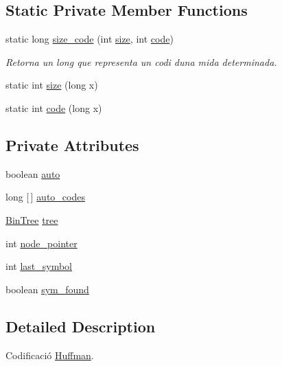 \subsection*{Static Private Member Functions}
\begin{DoxyCompactItemize}
\item 
static long \hyperlink{classdomini_1_1algorithm_1_1Huffman_a2c035fb63cf7b945bc56cca90c1343a3}{size\+\_\+code} (int \hyperlink{classdomini_1_1algorithm_1_1Huffman_a9ebf8a890196bc1f3af6917707c1096f}{size}, int \hyperlink{classdomini_1_1algorithm_1_1Huffman_a6ff0cdc5b992431ccfe8d77971ebf5e8}{code})
\begin{DoxyCompactList}\small\item\em Retorna un long que representa un codi d\textquotesingle{}una mida determinada. \end{DoxyCompactList}\item 
static int \hyperlink{classdomini_1_1algorithm_1_1Huffman_a9ebf8a890196bc1f3af6917707c1096f}{size} (long x)
\item 
static int \hyperlink{classdomini_1_1algorithm_1_1Huffman_a6ff0cdc5b992431ccfe8d77971ebf5e8}{code} (long x)
\end{DoxyCompactItemize}
\subsection*{Private Attributes}
\begin{DoxyCompactItemize}
\item 
boolean \hyperlink{classdomini_1_1algorithm_1_1Huffman_a1c2b6800e0b472c65f44ff9cf28a5b35}{auto}
\item 
long \mbox{[}$\,$\mbox{]} \hyperlink{classdomini_1_1algorithm_1_1Huffman_a0fa542dd4e914d8c0da5c070fe9f682f}{auto\+\_\+codes}
\item 
\hyperlink{classdomini_1_1utils_1_1BinTree}{Bin\+Tree} \hyperlink{classdomini_1_1algorithm_1_1Huffman_a6c010fa777f5601b7be908f8c876cf8e}{tree}
\item 
int \hyperlink{classdomini_1_1algorithm_1_1Huffman_a71e35eb22265910f918572b34eaa6b2f}{node\+\_\+pointer}
\item 
int \hyperlink{classdomini_1_1algorithm_1_1Huffman_a0da0a4274a58653bbe3e1c753adfbe38}{last\+\_\+symbol}
\item 
boolean \hyperlink{classdomini_1_1algorithm_1_1Huffman_a3453c53e74badc739d51208d35ba372d}{sym\+\_\+found}
\end{DoxyCompactItemize}


\subsection{Detailed Description}
Codificació \hyperlink{classdomini_1_1algorithm_1_1Huffman}{Huffman}. 

